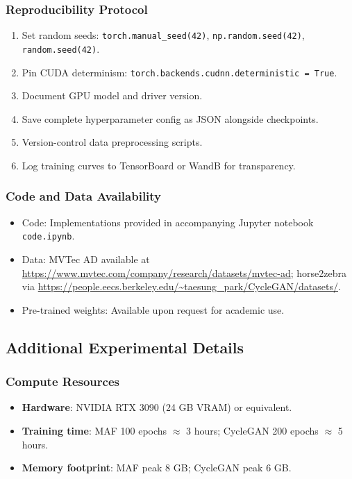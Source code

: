 \documentclass[conference]{IEEEtran}
\begin{document}
\subsubsection{Reproducibility Protocol}
\begin{enumerate}
\item Set random seeds: \texttt{torch.manual\_seed(42)}, \texttt{np.random.seed(42)}, \texttt{random.seed(42)}.
\item Pin CUDA determinism: \texttt{torch.backends.cudnn.deterministic = True}.
\item Document GPU model and driver version.
\item Save complete hyperparameter config as JSON alongside checkpoints.
\item Version-control data preprocessing scripts.
\item Log training curves to TensorBoard or WandB for transparency.
\end{enumerate}

\subsubsection{Code and Data Availability}
\begin{itemize}
\item Code: Implementations provided in accompanying Jupyter notebook \texttt{code.ipynb}.
\item Data: MVTec AD available at \url{https://www.mvtec.com/company/research/datasets/mvtec-ad}; horse2zebra via \url{https://people.eecs.berkeley.edu/~taesung_park/CycleGAN/datasets/}.
\item Pre-trained weights: Available upon request for academic use.
\end{itemize}

\subsection{Additional Experimental Details}
\subsubsection{Compute Resources}
\begin{itemize}
\item \textbf{Hardware}: NVIDIA RTX 3090 (24 GB VRAM) or equivalent.
\item \textbf{Training time}: MAF 100 epochs $\approx$ 3 hours; CycleGAN 200 epochs $\approx$ 5 hours.
\item \textbf{Memory footprint}: MAF peak 8 GB; CycleGAN peak 6 GB.
\end{itemize}
\end{document}
